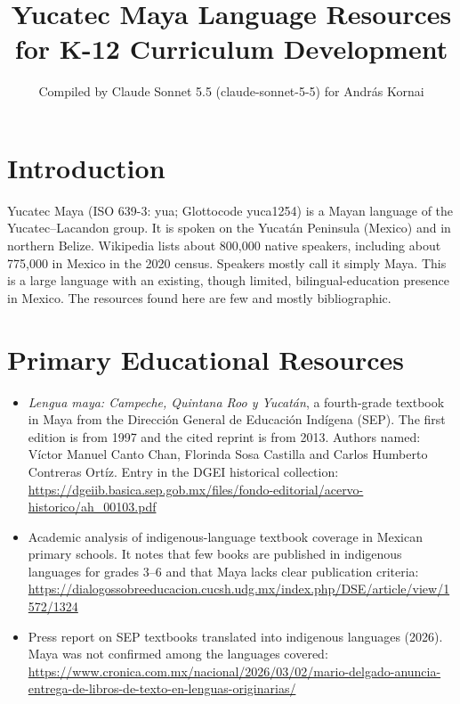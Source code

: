 \documentclass[12pt]{article}
\title{Yucatec Maya Language Resources for K-12 Curriculum Development}
\author{Compiled by Claude Sonnet 5.5 (claude-sonnet-5-5) for Andr\'as Kornai}
\date{}
\begin{document}
\maketitle

\section{Introduction}
Yucatec Maya (ISO 639-3: yua; Glottocode yuca1254) is a Mayan language of the Yucatec--Lacandon group. It is spoken on the Yucatán Peninsula (Mexico) and in northern Belize. Wikipedia lists about 800,000 native speakers, including about 775,000 in Mexico in the 2020 census. Speakers mostly call it simply Maya. This is a large language with an existing, though limited, bilingual-education presence in Mexico. The resources found here are few and mostly bibliographic.

\section{Primary Educational Resources}
\begin{itemize}
\item \emph{Lengua maya: Campeche, Quintana Roo y Yucatán}, a fourth-grade textbook in Maya from the Dirección General de Educación Indígena (SEP). The first edition is from 1997 and the cited reprint is from 2013. Authors named: Víctor Manuel Canto Chan, Florinda Sosa Castilla and Carlos Humberto Contreras Ortíz. Entry in the DGEI historical collection: \url{https://dgeiib.basica.sep.gob.mx/files/fondo-editorial/acervo-historico/ah_00103.pdf}
\item Academic analysis of indigenous-language textbook coverage in Mexican primary schools. It notes that few books are published in indigenous languages for grades 3--6 and that Maya lacks clear publication criteria: \url{https://dialogossobreeducacion.cucsh.udg.mx/index.php/DSE/article/view/1572/1324}
\item Press report on SEP textbooks translated into indigenous languages (2026). Maya was not confirmed among the languages covered: \url{https://www.cronica.com.mx/nacional/2026/03/02/mario-delgado-anuncia-entrega-de-libros-de-texto-en-lenguas-originarias/}
\end{itemize}
\end{document}
